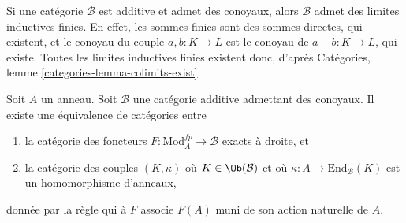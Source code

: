 \noindent
Si une catégorie $\mathcal{B}$ est additive et admet des conoyaux,
alors $\mathcal{B}$ admet des limites inductives finies. En effet, les sommes finies
sont des sommes directes, qui existent, et le conoyau du couple $a, b : K \to L$
est le conoyau de $a - b : K \to L$, qui existe. Toutes les limites inductives
finies existent donc, d'après Catégories, lemme \ref{categories-lemma-colimits-exist}.

\begin{lemma}
\label{lemma-functor-on-modules-fp}
Soit $A$ un anneau. Soit $\mathcal{B}$ une catégorie additive
admettant des conoyaux. Il existe une équivalence de catégories entre
\begin{enumerate}
\item la catégorie des foncteurs $F : \text{Mod}^{fp}_A \to \mathcal{B}$
exacts à droite, et
\item la catégorie des couples $(K, \kappa)$ où $K \in \Ob(\mathcal{B})$
et où $\kappa : A \to \text{End}_\mathcal{B}(K)$ est un homomorphisme d'anneaux,
\end{enumerate}
donnée par la règle qui à $F$ associe $F(A)$ muni de son action naturelle de $A$.
\end{lemma}

